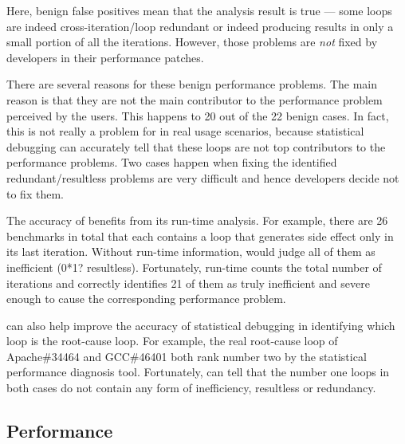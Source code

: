 Here, benign false positives mean that the \Tool analysis result is true ---
some loops are indeed cross-iteration/loop redundant or indeed producing
results in only a small portion of all the iterations. However, those
problems are \textit{not} fixed by developers in their performance patches. 

There are several reasons for these benign performance problems. 
The main reason is that they are not the main contributor to the 
performance problem perceived by the users. {\color{red} This happens to 20 out of the
22 benign cases.} %
In fact, this is not really a problem for \Tool in 
real usage scenarios, because statistical debugging can accurately
tell that these loops are not top contributors to the performance
problems.
Two cases happen when fixing the 
identified redundant/resultless problems
are very difficult and hence developers decide not to fix them.

The accuracy of \Tool benefits from its run-time analysis.
{\color{red} For example, there are 26 %
benchmarks in total that each contains
a loop that generates side effect only
in its last iteration. Without run-time information, \Tool would judge
all of them as inefficient (0*1? resultless). Fortunately,
\Tool run-time counts the total number of iterations and
correctly identifies 21 %
of them as truly inefficient and severe enough
to cause the corresponding performance problem.
}

\Tool can also help improve the accuracy of statistical debugging in
identifying which loop is the root-cause loop.
For example, the real root-cause loop of Apache\#34464 and GCC\#46401 both
rank number two by the statistical performance diagnosis tool.
Fortunately,
\Tool can tell that the number one loops in both cases do not contain
any form of inefficiency, resultless or redundancy. 

\subsection{Performance}
\label{sec:result_perf}

